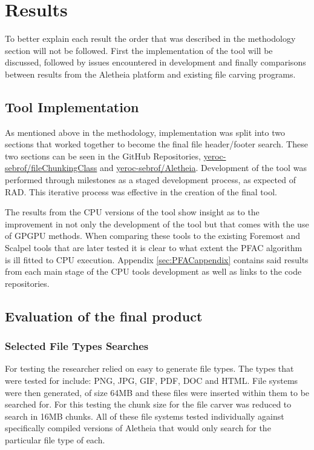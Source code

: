 

\chapter{Results}
\label{chap:chapter4}
To better explain each result the order that was described in the methodology section will not be followed.
First the implementation of the tool will be discussed, followed by issues encountered in development and finally comparisons between results from the Aletheia platform and existing file carving programs.

\section{Tool Implementation}
\label{sec:PFACResults}
As mentioned above in the methodology, implementation was split into two sections that worked together to become the final file header/footer search.
These two sections can be seen in the GitHub Repositories, \href{https://github.com/yeroc-sebrof/fileChunkingClass}{yeroc-sebrof/fileChunkingClass} and \href{https://github.com/yeroc-sebrof/Aletheia}{yeroc-sebrof/Aletheia}.
Development of the tool was performed through milestones as a staged development process, as expected of \acl{RAD}.
This iterative process was effective in the creation of the final tool.

The results from the \ac{CPU} versions of the tool show insight as to the improvement in not only the development of the tool but that comes with the use of \ac{GPGPU} methods.
When comparing these tools to the existing Foremost and Scalpel tools that are later tested it is clear to what extent the \ac{PFAC} algorithm is ill fitted to CPU execution.
Appendix \ref{sec:PFACappendix} contains said results from each main stage of the \ac{CPU} tools development as well as links to the code repositories.

\section{Evaluation of the final product}
\subsection{Selected File Types Searches}
\label{sec:fileTypeTest}
For testing the researcher relied on easy to generate file types.
The types that were tested for include: PNG, JPG, GIF, PDF, DOC and HTML.
File systems were then generated, of size 64\ac{MB} and these files were inserted within them to be searched for.
For this testing the chunk size for the file carver was reduced to search in 16\ac{MB} chunks.
All of these file systems tested individually against specifically compiled versions of Aletheia that would only search for the particular file type of each.

